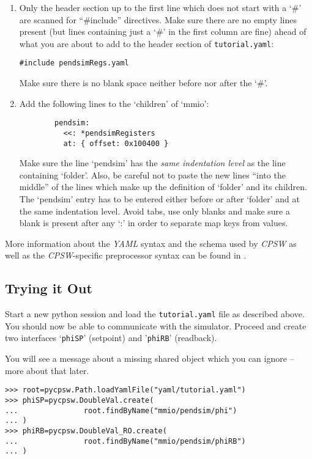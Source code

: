 \documentclass[10pt]{article}
\newcommand{\ita}[1]{\emph{#1}}
\newcommand{\cpsw}      {\ita {CPSW}}
\newcommand{\yaml}      {\ita {YAML}}
\newcommand{\py}        {python}
\newcommand{\cod}[1] {{\tt#1}}
\newcommand{\tutyaml} {\cod{tutorial.yaml}}
\begin{document}
\begin{enumerate}
\item Only the header section up to the first line which does not start with a `\#'
      are scanned for ``\#include'' directives. Make sure there are no empty lines
      present (but lines containing just a `\#' in the first column are fine) ahead
      of what you are about to add to the header section of \tutyaml{}:
\begin{verbatim}
#include pendsimRegs.yaml
\end{verbatim}
      Make sure there is no blank space neither before nor after the `\#'.

\item Add the following lines to the `children' of `mmio':
\begin{verbatim}
        pendsim:
          <<: *pendsimRegisters
          at: { offset: 0x100400 }
\end{verbatim}
      Make sure the line `pendsim' has the {\em same indentation level} as the
      line containing `folder'. Also, be careful not to paste the new lines ``into
      the middle'' of the lines which make up the definition of `folder' and its
      children. The `pendsim' entry has to be entered either before or after `folder'
      and at the same indentation level. Avoid tabs, use only blanks and make sure
      a blank is present after any `:' in order to separate map keys from values.
\end{enumerate}

More information about the \yaml{} syntax and the schema used by \cpsw{} as
well as the \cpsw{}-specific preprocessor syntax can be found in \cite{yaml,yamlDefinition}.

\subsection{Trying it Out}
Start a new \py{} session and load the \tutyaml{} file as described above.
You should now be able to communicate with the simulator. Proceed and
create two interfaces `\cod{phiSP}' (setpoint) and '\cod{phiRB}' (readback).

You will see a message about a missing shared object which you can ignore --
more about that later.

\begin{verbatim}
>>> root=pycpsw.Path.loadYamlFile("yaml/tutorial.yaml")
>>> phiSP=pycpsw.DoubleVal.create(
...               root.findByName("mmio/pendsim/phi")
... )
>>> phiRB=pycpsw.DoubleVal_RO.create(
...               root.findByName("mmio/pendsim/phiRB")
... )
\end{verbatim}
\end{document}
